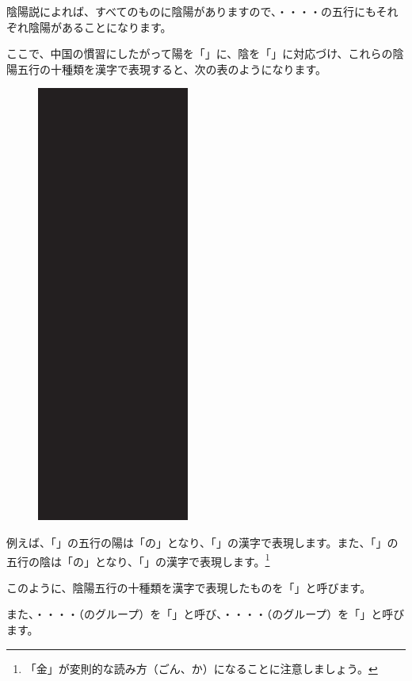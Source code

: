 \documentclass[a5paper,11pt,dvipdfmx]{tarticle}
\begin{document}
陰陽説によれば、すべてのものに陰陽がありますので、・・・・の五行にもそれぞれ陰陽があることになります。

ここで、中国の慣習にしたがって陽を「」に、陰を「」に対応づけ、これらの陰陽五行の十種類を漢字で表現すると、次の表のようになります。

\begin{figure}[hbp]
  \centering
  \includegraphics[width=50mm,angle=90]{figs/table2-1.eps}
\end{figure}

例えば、「」の五行の陽は「の」となり、「」の漢字で表現します。また、「」の五行の陰は「の」となり、「」の漢字で表現します。\footnote{「金」が変則的な読み方（ごん、か）になることに注意しましょう。}

このように、陰陽五行の十種類を漢字で表現したものを「」と呼びます。

また、・・・・（のグループ）を「」と呼び、・・・・（のグループ）を「」と呼びます。
\end{document}
